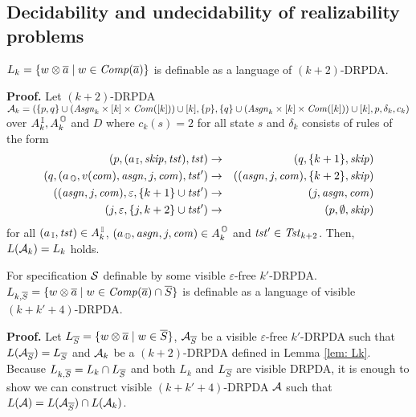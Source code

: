 \subsection{Decidability and undecidability of realizability problems}
\begin{lemma}\label{lem: Lk}
$L_k = \{w\otimes\overline{a} \mid w\in{\mathit{Comp}}(\overline{a})\}$ is definable as a language of $(k+2)$-DRPDA.
\end{lemma}
{\bf Proof.}\quad
Let $(k+2)$-DRPDA ${\cal A}_k = (\{p, q\}\cup(\mathit{Asgn}_k\times[k]\times\mathit{Com}([k]))\cup[k], \{p\}, \{q\}\cup(\mathit{Asgn}_k\times[k]\times\mathit{Com}([k]))\cup[k], p, \delta_k, c_k)$ over $A_k^{\, \mathbb{I}}, A_k^{\, \mathbb{O}}$ and $D$ where
$c_k(s)=2$ for all state $s$ and $\delta_k$ consists of rules of the form
\begin{eqnarray}
(p, (a_{\, \mathbb{I}}, \mathit{skip}, \mathit{tst}), \mathit{tst}) &\to& (q, \{k+1\}, \mathit{skip})\label{eq: Lk1}\\
(q, (a_{\, \mathbb{O}}, v(\mathit{com}), \mathit{asgn}, j, \mathit{com}), \mathit{tst}')&\to& ((\mathit{asgn},j,\mathit{com}), \{k+2\},\mathit{skip})\label{eq: Lk2}\\
((\mathit{asgn},j,\mathit{com}), \varepsilon, \{k+1\}\cup\mathit{tst}')&\to& (j, \mathit{asgn}, \mathit{com})\label{eq: Lk3}\\
(j, \varepsilon, \{j, k+2\}\cup\mathit{tst}')&\to& (p, \emptyset, \mathit{skip})\label{eq: Lk4}
\end{eqnarray}
for all $(a_{\, \mathbb{I}}, \mathit{tst})\in A_k^{\, \mathbb{I}}$, $(a_{\, \mathbb{O}}, \mathit{asgn}, j, \mathit{com})\in A_k^{\, \mathbb{O}}$ and $\mathit{tst}'\in\mathit{Tst}_{k+2}$.
Then, $L({\cal A}_k) = L_k$ holds.

\begin{lemma}\label{lem: LkS}
For specification ${\cal S}$ definable by some visible $\varepsilon$-free $k'$-DRPDA.
$L_{k, \overline{S}} = \{w\otimes\overline{a} \mid w\in{\mathit{Comp}}(\overline{a})\cap \overline{S}\}$
is definable as a language of visible $(k+k'+4)$-DRPDA.
\end{lemma}
{\bf Proof.}\quad
Let $L_{\overline{S}} = \{w\otimes\overline{a}\mid w\in\overline{S}\}$,
${\cal A}_{\overline{S}}$ be a visible $\varepsilon$-free $k'$-DRPDA such that $L({\cal A}_{\overline{S}})= L_{\overline{S}}$ and ${\cal A}_k$ be a $(k+2)$-DRPDA defined in Lemma \ref{lem: Lk}.
Because $L_{k, \overline{S}} = L_k \cap L_{\overline{S}}$ and both $L_k$ and $L_{\overline{S}}$ are
visible DRPDA, it is enough to show we can construct visible $(k+k'+4)$-DRPDA ${\cal A}$ such that $L({\cal A})=L({\cal A}_{\overline{S}})\cap L({\cal A}_k)$.


